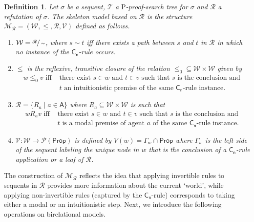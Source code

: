 \documentclass{myifcolog}
\newcommand\Prop {\mathsf{Prop}}
\newcommand\A{\mathsf{A}}
\newcommand{\agi}{a}
\newcommand{\fw}{\mathcal{M}}
\newcommand{\W}{\mathcal{W}}
\newcommand{\rel}{\mathcal{R}}
\newcommand{\V}{\mathcal{V}}
\newcommand{\hickp}{\mathrm{P}}
\newtheorem{definition}[theorem]{Definition}
\numberwithin{theorem}{section}
\begin{document}
\begin{definition}\label{d: canonical model for nIM}
    Let $\sigma$ be a sequent, $\mathcal{T}$ a $\hickp$-proof-search tree for $\sigma$ and $\mathscr{R}$ a refutation of $\sigma$. The \emph{skeleton model} based on $\mathscr{R}$ is the structure $\fw_\mathscr{R}=(\W, \leq, \rel, \V)$ defined as follows.
    \begin{enumerate}
        \item $\W = \sfrac{\mathscr{R}}{\sim}$, where $s \sim t$ iff there exists a path between $s$ and $t$ in $\mathscr{R}$ in which no instance of the $\mathsf{C_n}$-rule occurs.

        \item $\leq$ is the reflexive, transitive closure of the relation $ {\leq_0} \subseteq \W \times \W$ given by
        \begin{equation*}
        \begin{split}
            w \leq_0 v \text{ iff } &\text{there exist } s \in w \text{ and } t \in v \text{ such that } s \text{ is the conclusion and }\\ &t \text{ an intuitionistic premise}
            \text{ of the same } \mathsf{C_n}\text{-rule instance.}
         \end{split}
        \end{equation*}
        

        
        \item $\rel = \{R_\agi \mid \agi \in \A\}$ where $R_\agi\subseteq \W\times \W$ is such that
        \[
        \begin{split}
            w \mathrel{R_\agi} v \text{ iff } &\text{there exist } s \in w \text{ and } t \in v \text{ such that } s \text{ is the conclusion and }\\ &t \text{ is a modal} \text{ premise of agent $\agi$ of the same } \mathsf{C_n}\text{-rule instance.}
         \end{split}
        \]

        
        \item $\V \colon \W \longrightarrow \mathcal{P}(\Prop)$ is defined by  $V(w) = \Gamma_w \cap \Prop$ where $\Gamma_w$ is the left side of the sequent labeling the unique node in \( w \) that is the conclusion of a $\mathsf{C_n}$-rule application or a leaf of $\mathscr{R}$.
    \end{enumerate}

\end{definition}
\noindent The construction of $\fw_\mathscr{R}$ reflects the idea that applying invertible rules to sequents in $\mathscr{R}$ provides more information about the current `world', while applying non-invertible rules (captured by the $\mathsf{C_n}$-rule) corresponds to taking either a modal or an intuitionistic step. Next, we introduce the following operations on birelational models.
\end{document}
